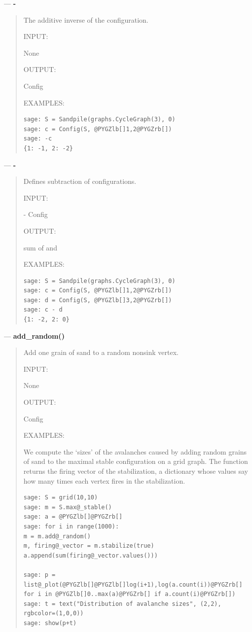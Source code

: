 \documentclass[letterpaper,10pt,english]{manual}
\begin{document}
---
\hypertarget{neg}{}
\textbf{-}
\begin{quote}

The additive inverse of the configuration.

INPUT:

None

OUTPUT:

Config

EXAMPLES:

\begin{Verbatim}[commandchars=@\[\]]
sage: S = Sandpile(graphs.CycleGraph(3), 0)
sage: c = Config(S, @PYGZlb[]1,2@PYGZrb[])
sage: -c
{1: -1, 2: -2}
\end{Verbatim}
\end{quote}

---
\hypertarget{id11}{}
\textbf{-}
\begin{quote}

Defines subtraction of configurations.

INPUT:

 - Config

OUTPUT:

sum of  and 

EXAMPLES:

\begin{Verbatim}[commandchars=@\[\]]
sage: S = Sandpile(graphs.CycleGraph(3), 0)
sage: c = Config(S, @PYGZlb[]1,2@PYGZrb[])
sage: d = Config(S, @PYGZlb[]3,2@PYGZrb[])
sage: c - d
{1: -2, 2: 0}
\end{Verbatim}
\end{quote}

---
\hypertarget{add-random}{}
\textbf{add\_random()}
\begin{quote}

Add one grain of sand to a random nonsink vertex.

INPUT:

None

OUTPUT:

Config

EXAMPLES:

We compute the `sizes' of the avalanches caused by adding random grains
of sand to the maximal stable configuration on a grid graph.  The
function  returns the firing vector of the
stabilization, a dictionary whose values say how many times each vertex
fires in the stabilization.

\begin{Verbatim}[commandchars=@\[\]]
sage: S = grid(10,10)
sage: m = S.max@_stable()
sage: a = @PYGZlb[]@PYGZrb[]
sage: for i in range(1000):
m = m.add@_random()
m, firing@_vector = m.stabilize(true)
a.append(sum(firing@_vector.values()))

sage: p = list@_plot(@PYGZlb[]@PYGZlb[]log(i+1),log(a.count(i))@PYGZrb[] for i in @PYGZlb[]0..max(a)@PYGZrb[] if a.count(i)@PYGZrb[])
sage: t = text("Distribution of avalanche sizes", (2,2), rgbcolor=(1,0,0))
sage: show(p+t)
\end{Verbatim}
\end{quote}
\end{document}
